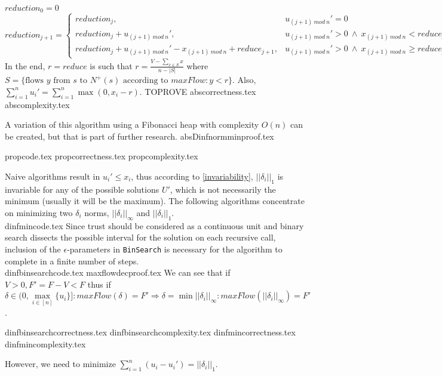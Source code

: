 \documentclass[11pt]{llncs}
\begin{document}
  $reduction_0 = 0$ \\
  $reduction_{j+1} =
     \begin{cases}
        reduction_j, & u_{(j+1)\:mod\:n}' = 0 \\
        reduction_j + u_{(j+1)\:mod\:n}', & u_{(j+1)\:mod\:n}' > 0 \: \wedge \: x_{(j+1) \:mod\:n} < reduce_j \\
        reduction_j + u_{(j+1)\:mod\:n}' - x_{(j+1)\:mod\:n} + reduce_{j+1}, &
           u_{(j+1)\:mod\:n}' > 0 \: \wedge \: x_{(j+1) \:mod\:n} \geq reduce_j
     \end{cases}$ \\
  In the end, $r = reduce$ is such that $r = \frac{V - \sum\limits_{x \in S}x}{n - |S|}$ where
  $S = \{\text{flows } y \text{ from } s \text{ to } N^{+}(s) \text{ according to } maxFlow : y < r\}$. Also,
  $\sum\limits_{i=1}^{n}u_i' = \sum\limits_{i=1}^{n}\max{(0,x_i - r)}$. TOPROVE
  {abscorrectness.tex}
  {abscomplexity.tex}

  A variation of this algorithm using a Fibonacci heap with complexity $O(n)$ can be created, but that is part of
  further research.
  {absDinfnormminproof.tex}

  {propcode.tex}
  {propcorrectness.tex}
  {propcomplexity.tex}

  Naive algorithms result in $u_i' \leq x_i$, thus according to \ref{invariability}, $||\delta_i||_1$ is invariable for
  any of the possible solutions $U'$, which is not necessarily the minimum (usually it will be the maximum). The following
  algorithms concentrate on minimizing two $\delta_i$ norms, $||\delta_i||_\infty$ and $||\delta_i||_1$. \\
  {dinfmincode.tex}
  Since trust should be considered as a continuous unit and binary search dissects the possible interval for the solution
  on each recursive call, inclusion of the $\epsilon$-parameters in \texttt{BinSearch} is necessary for the algorithm to
  complete in a finite number of steps. \\
  {dinfbinsearchcode.tex}
  {maxflowdecproof.tex}
  We can see that if $V > 0, F' = F - V < F$ thus if $\delta \in (0, \max\limits_{i \in [n]}\{u_i\}]:
  maxFlow(\delta)= F' \Rightarrow \delta = \min||\delta_i||_\infty : maxFlow(||\delta_i||_\infty) = F'$.

  {dinfbinsearchcorrectness.tex}
  {dinfbinsearchcomplexity.tex}
  {dinfmincorrectness.tex}
  {dinfmincomplexity.tex}

  However, we need to minimize $\sum\limits_{i=1}^{n}(u_i-u_i') = ||\delta_i||_1$.
\end{document}
